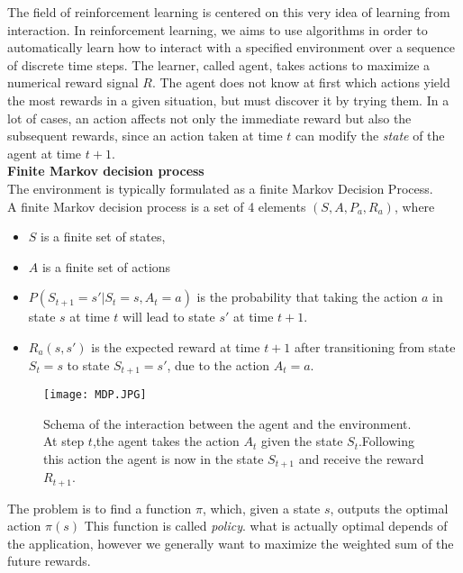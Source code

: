 \documentclass[11pt, onecolumn, a4paper]{report}
\begin{document}
The field of reinforcement learning is centered on this very idea of learning from interaction. In reinforcement learning, we aims to use algorithms in order to automatically learn how to interact with a specified environment over a sequence of discrete time steps. The learner, called agent, takes actions to maximize a numerical reward signal $R$. The agent does not know at first which actions yield the most rewards in a given situation, but must discover it by trying them. In a lot of cases, an action affects not only the immediate reward but also the subsequent rewards, since an action taken at time $t$ can modify the \textit{state} of the agent at time $t+1$.\\



\textbf{Finite Markov decision process}\\

The environment is typically formulated as a finite Markov Decision Process. \\
A finite Markov decision process is a set of 4 elements $(S,A,P_{a},R_{a})$, where

\begin{itemize}

\item $S$ is a finite set of states,
\item$A$ is a finite set of actions 
\item$P(S_{t+1}=s'|S_t=s,A_t=a)$ is the probability that taking the action $a$ in state $s$ at time $t$ will lead to state $s'$ at time $t+1$. 
\item $R_{a}(s,s')$ is the expected reward at time $t+1$ after transitioning from state $S_t=s$ to state $S_{t+1}=s'$, due to the action $A_t=a$. 
\end{itemize}


\begin{figure}[H]
\texttt{[image: MDP.JPG]}
\caption{Schema\cite{1} of the interaction between the agent and the environment. At step $t$,the agent takes the action $A_t$ given the state $S_t$.Following this action the agent is now in the state $S_{t+1}$ and receive the reward $R_{t+1}$.}
\end{figure}

The problem is to find a function $\pi$, which, given a state $s$, outputs the optimal action $\pi(s)$  This function is called \textit{policy}. what is actually optimal depends of the application, however we generally want to maximize the weighted sum of the future rewards. \\
\end{document}
